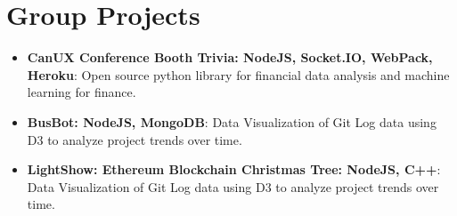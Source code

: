 \documentclass[letterpaper,11pt]{article}
\newcommand{\resumeItem}[2]{
  \item\small{
    \textbf{#1}{: #2 \vspace{-2pt}}
  }
}
\newcommand{\resumeSubItem}[2]{\resumeItem{#1}{#2}\vspace{-4pt}}
\newcommand{\resumeSubHeadingListStart}{\begin{itemize}[leftmargin=*]}
\newcommand{\resumeSubHeadingListEnd}{\end{itemize}}
\begin{document}
\section{Group Projects}
  \resumeSubHeadingListStart
    \resumeSubItem{CanUX Conference Booth Trivia: NodeJS, Socket.IO, WebPack, Heroku}
      {Open source python library for financial data analysis and machine learning for finance.}
    \resumeSubItem{BusBot: NodeJS, MongoDB}
      {Data Visualization of Git Log data using D3 to analyze project trends over time.}
       \resumeSubItem{LightShow: Ethereum Blockchain Christmas Tree: NodeJS, C++}
      {Data Visualization of Git Log data using D3 to analyze project trends over time.}
  \resumeSubHeadingListEnd

%


\end{document}
